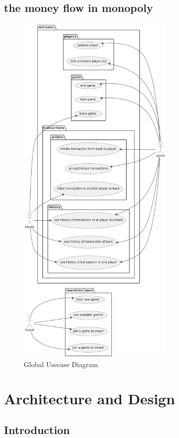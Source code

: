 \documentclass{article}
\begin{document}
\subsection { the money flow in monopoly }
\begin{figure}[H]
	\centering
	\includegraphics[height=7in]{../thesis_tex/assets/diagrams/global_ucd.png}
	\caption{Global Usecase Diagram}
\end{figure}

\section{Architecture and Design}

\subsection{Introduction}

\cleardoublepage
\end{document}
